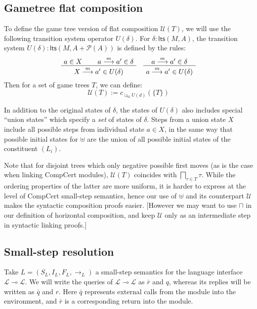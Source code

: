\documentclass[11pt]{article}
\newcommand{\kw}[1]{{\mathsf{#1}}}
\begin{document}
\subsection{Gametree flat composition}

To define the game tree version of flat composition $\mathcal{U}(T)$,
we will use the following transition system operator $U(\delta)$.
For $\delta : \kw{lts}(M, A)$,
the transition system $U(\delta) : \kw{lts}(M, A + \mathcal{P}(A))$
is defined by the rules:
\[
  \AxiomC{$a \in X$}
  \AxiomC{$a \stackrel{m}{\longrightarrow} a' \in \delta$}
  \BinaryInfC{$X \stackrel{m}{\longrightarrow} a' \in U(\delta)$}
  \DisplayProof
  \quad
  \AxiomC{$a \stackrel{m}{\longrightarrow} a' \in \delta$}
  \UnaryInfC{$a \stackrel{m}{\longrightarrow} a' \in U(\delta)$}
  \DisplayProof
\]
Then for a set of game trees $T$,
we can define:
\[
  \mathcal{U}(T) := c_{\sqcup_\kw{tc} U(d)}(\{ T \})
\]

In addition to the original states of $\delta$,
the states of $U(\delta)$ also includes special ``union states''
which specify a \emph{set} of states of $\delta$.
Steps from a union state $X$ include all possible steps
from individual state $a \in X$,
in the same way that possible initial states for $\uplus$
are the union of all possible initial states of the constituent $(L_i)$.

Note that for disjoint trees which only negative possible first moves
(as is the case when linking CompCert modules),
$\mathcal{U}(T)$ coincides with $\bigsqcap_{\tau \in T} \tau$.
While the ordering properties of the latter
are more uniform,
it is harder to express at the level of CompCert small-step semantics,
hence our use of $\uplus$ and its counterpart $\mathcal{U}$
makes the syntactic composition proofs easier.
[However we may want to use $\sqcap$
in our definition of horizontal composition,
and keep $\mathcal{U}$ only as an intermediate step
in syntactic linking proofs.]

\subsection{Small-step resolution}

Take $L = (S_L, I_L, F_L, {\rightarrow_L})$ a small-step semantics
for the language interface $\mathcal{L} \multimap \mathcal{L}$.
We will write the queries of $\mathcal{L} \multimap \mathcal{L}$
as $\bar{r}$ and $q$,
whereas its replies will be written
as $\bar{q}$ and $r$.
Here $\bar{q}$ represents external calls from the module into the environment,
and $\bar{r}$ is a corresponding return into the module.
\end{document}
